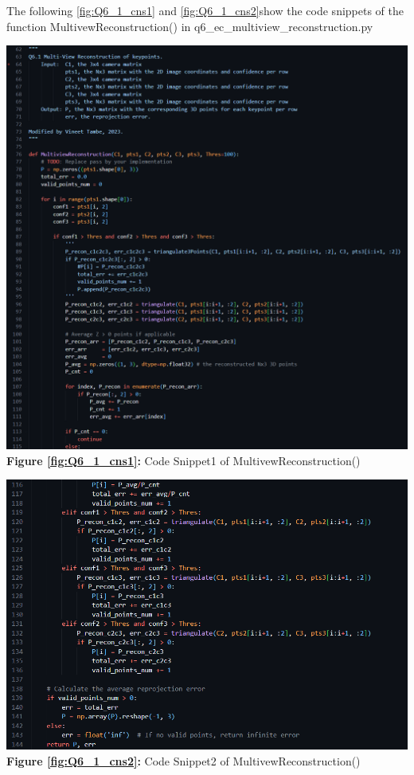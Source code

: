 \begin{your_solution}[title=Q6.1 continued,height=11.5cm,width=\linewidth]
	The following \autoref{fig:Q6_1_cns1} and \autoref{fig:Q6_1_cns2}show the code snippets of the function MultivewReconstruction() in q6\_ec\_multiview\_reconstruction.py
	\newline
	
	\begin{minipage}[b]{0.5\textwidth}
		\centering
		\includegraphics[width=\textwidth]{../Q6_1_cns1.png}
		\textbf{Figure \ref{fig:Q6_1_cns1}:} Code Snippet1 of MultivewReconstruction()
		\label{fig:Q6_1_cns1}         %
	\end{minipage}
	\begin{minipage}[b]{0.5\textwidth}
		\centering
		\includegraphics[width=\textwidth]{../Q6_1_cns2.png}
		\textbf{Figure \ref{fig:Q6_1_cns2}:} Code Snippet2 of MultivewReconstruction()
		\label{fig:Q6_1_cns2}  
	\end{minipage}
\end{your_solution}


